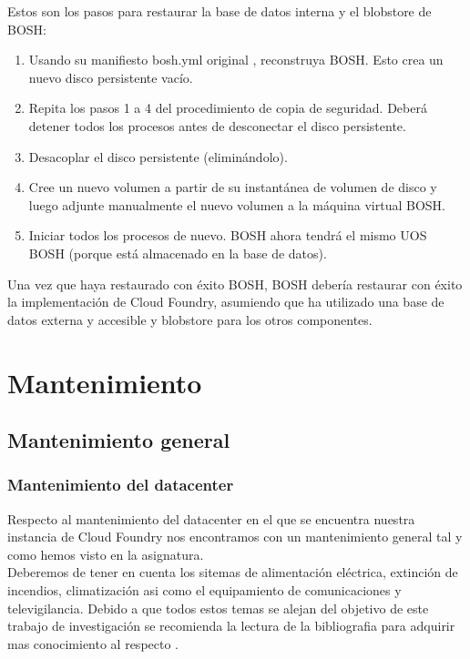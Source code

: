 \documentclass[a4paper,11pt]{article}
\begin{document}
Estos son los pasos para restaurar la base de datos interna y el blobstore de BOSH:
\begin{enumerate}
  \item Usando su manifiesto bosh.yml original , reconstruya BOSH. Esto crea un nuevo disco persistente vacío.
  \item Repita los pasos 1 a 4 del procedimiento de copia de seguridad. Deberá detener todos los procesos antes de desconectar el disco persistente.
  \item Desacoplar el disco persistente (eliminándolo).
  \item Cree un nuevo volumen a partir de su instantánea de volumen de disco y luego adjunte manualmente el nuevo volumen a la máquina virtual BOSH.
  \item Iniciar todos los procesos de nuevo. BOSH ahora tendrá el mismo UOS BOSH (porque está almacenado en la base de datos).
\end{enumerate}
Una vez que haya restaurado con éxito BOSH, BOSH debería restaurar con éxito la implementación de Cloud Foundry, asumiendo que ha utilizado una base de datos externa y accesible y blobstore para los otros componentes.





\section{Mantenimiento}
\subsection{Mantenimiento general}
\subsubsection{Mantenimiento del datacenter}
Respecto al mantenimiento del datacenter en el que se encuentra nuestra instancia de Cloud Foundry nos encontramos con un mantenimiento general tal y como hemos visto en la asignatura.\\
Deberemos de tener en cuenta los sitemas de alimentación eléctrica, extinción de incendios, climatización asi como el equipamiento de comunicaciones y televigilancia. Debido a que todos estos temas se alejan del objetivo de este trabajo de investigación se recomienda la lectura de la bibliografia para adquirir mas conocimiento al respecto \cite{cpdbib}.
\end{document}
